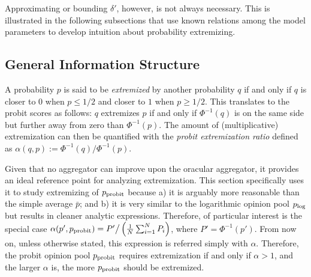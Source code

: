 \documentclass[12pt]{article}
\theoremstyle{definition}
\theoremstyle{definition}
\def\probit{p_{\rm probit}}
\def\plog{p_{\rm log}}
\begin{document}
Approximating or bounding $\delta'$, however, is not always necessary. This is illustrated in the following subsections that use known relations among the model parameters to develop intuition about probability extremizing. 

\subsection{General Information Structure}

A probability $p$ is said to be \textit{extremized} by another probability $q$ if and only
if $q$ is closer to $0$ when $p \leq 1/2$ and closer to $1$ when $p
\geq 1/2$. This translates to the probit scores as follows: $q$ extremizes $p$ if and only if  $\Phi^{-1}(q)$ is on the same side but further away from zero than $\Phi^{-1}(p)$. The amount of (multiplicative) extremization can then be quantified with the {\em probit extremization ratio} defined as 
 $\alpha(q,p) := \Phi^{-1}(q) / \Phi^{-1} (p)$. 
 
 
 Given that no aggregator can improve upon the oracular aggregator, it provides an ideal
reference point for analyzing extremization. This section specifically uses it to study
extremizing of $\probit$ because a) it is arguably more
reasonable than the simple average $\bar{p}$; and b) it is very
similar to the logarithmic opinion pool $\plog$ but results in cleaner
analytic expressions. Therefore, of particular interest is the special case $\alpha(p', \probit)  = P' \big/ \left(\frac{1}{N}\sum_{i=1}^N P_{i} \right)$, where $P' = \Phi^{-1}(p')$. From now on, unless otherwise stated, this expression is referred simply with
$\alpha$. 
Therefore, the probit opinion pool $\probit$
requires extremization if and only if $\alpha > 1$, and the larger $\alpha$ is, the more $\probit$ should be extremized. 
\end{document}
